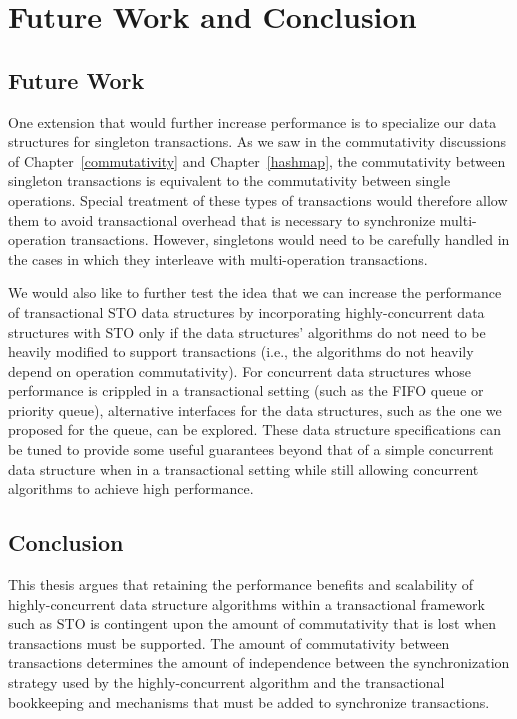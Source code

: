 \chapter{Future Work and Conclusion}

\section{Future Work}
One extension that would further increase performance is to specialize our data structures for singleton transactions. As we saw in the commutativity discussions of Chapter~\ref{commutativity} and Chapter~\ref{hashmap}, the commutativity between singleton transactions is equivalent to the commutativity between single operations. Special treatment of these types of transactions would therefore allow them to avoid transactional overhead that is necessary to synchronize multi-operation transactions. However, singletons would need to be carefully handled in the cases in which they interleave with multi-operation transactions. 

We would also like to further test the idea that we can increase the performance of transactional STO data structures by incorporating highly-concurrent data structures with STO only if the data structures' algorithms do not need to be heavily modified to support transactions (i.e., the algorithms do not heavily depend on operation commutativity).
For concurrent data structures whose performance is crippled in a transactional setting (such as the FIFO queue or priority queue), alternative interfaces for the data structures, such as the one we proposed for the queue, can be explored. These data structure specifications can be tuned to provide some useful guarantees beyond that of a simple concurrent data structure when in a transactional setting while still allowing concurrent algorithms to achieve high performance.

\section{Conclusion}
This thesis argues that retaining the performance benefits and scalability of highly-concurrent data structure algorithms within a transactional framework such as STO is contingent upon the amount of commutativity that is lost when transactions must be supported. The amount of commutativity between transactions determines the amount of independence between the synchronization strategy used by the highly-concurrent algorithm and the transactional bookkeeping and mechanisms that must be added to synchronize transactions.

